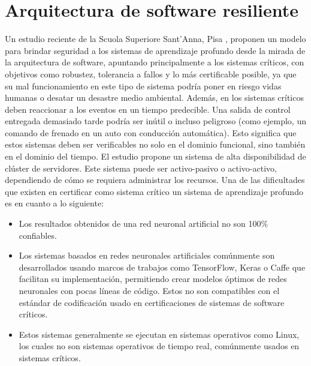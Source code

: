 \section{Arquitectura de software resiliente}
Un estudio reciente de la Scuola Superiore Sant’Anna, Pisa \parencite{r5}, proponen un modelo para brindar seguridad a los sistemas de aprendizaje profundo desde la mirada de la arquitectura de software, apuntando principalmente a los sistemas críticos, con objetivos como robustez, tolerancia a fallos y lo más certificable posible, ya que su mal funcionamiento en este tipo de sistema podría poner en riesgo vidas humanas o desatar un desastre medio ambiental. Además, en los sistemas críticos deben reaccionar a los eventos en un tiempo predecible. Una salida de control entregada demasiado tarde podría ser inútil o incluso peligroso (como ejemplo, un comando de frenado en un auto con conducción automática). Esto significa que estos sistemas deben ser verificables no solo en el dominio funcional, sino también en el dominio del tiempo. El estudio propone un sistema de alta disponibilidad de clúster de servidores. Este sistema puede ser activo-pasivo o activo-activo, dependiendo de cómo se requiera administrar los recursos. 
Una de las dificultades que existen en certificar como sistema crítico un sistema de aprendizaje profundo es en cuanto a lo siguiente:
\begin{itemize}
    \item Los resultados obtenidos de una red neuronal artificial no son 100\% confiables. 
    \item Los sistemas basados en redes neuronales artificiales comúnmente son desarrollados usando marcos de trabajos como TensorFlow, Keras o Caffe que facilitan su implementación, permitiendo crear modelos óptimos de redes neuronales con pocas líneas de código. Estos no son compatibles con el estándar de codificación usado en certificaciones de sistemas de software críticos. 
    \item Estos sistemas generalmente se ejecutan en sistemas operativos como Linux, los cuales no son sistemas operativos de tiempo real, comúnmente usados en sistemas críticos.
\end{itemize}
